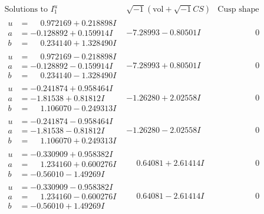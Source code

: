 \documentclass[1p]{elsarticle_modified}
\theoremstyle{definition}
\newcommand{\I}{\sqrt{-1}}
\begin{document}
$$\begin{array}{c|c|c}  
\text{Solutions to }I^u_{1}& \I (\text{vol} + \sqrt{-1}CS) & \text{Cusp shape}\\
 \hline 
\begin{aligned}
u &= \phantom{-}0.972169 + 0.218898 I \\
a &= -0.128892 + 0.159914 I \\
b &= \phantom{-}0.234140 + 1.328490 I\end{aligned}
 & -7.28993 - 0.80501 I & \phantom{-0.000000 } 0 \\ \hline\begin{aligned}
u &= \phantom{-}0.972169 - 0.218898 I \\
a &= -0.128892 - 0.159914 I \\
b &= \phantom{-}0.234140 - 1.328490 I\end{aligned}
 & -7.28993 + 0.80501 I & \phantom{-0.000000 } 0 \\ \hline\begin{aligned}
u &= -0.241874 + 0.958464 I \\
a &= -1.81538 + 0.81812 I \\
b &= \phantom{-}1.106070 - 0.249313 I\end{aligned}
 & -1.26280 + 2.02558 I & \phantom{-0.000000 } 0 \\ \hline\begin{aligned}
u &= -0.241874 - 0.958464 I \\
a &= -1.81538 - 0.81812 I \\
b &= \phantom{-}1.106070 + 0.249313 I\end{aligned}
 & -1.26280 - 2.02558 I & \phantom{-0.000000 } 0 \\ \hline\begin{aligned}
u &= -0.330909 + 0.958382 I \\
a &= \phantom{-}1.234160 + 0.600276 I \\
b &= -0.56010 - 1.49269 I\end{aligned}
 & \phantom{-}0.64081 + 2.61414 I & \phantom{-0.000000 } 0 \\ \hline\begin{aligned}
u &= -0.330909 - 0.958382 I \\
a &= \phantom{-}1.234160 - 0.600276 I \\
b &= -0.56010 + 1.49269 I\end{aligned}
 & \phantom{-}0.64081 - 2.61414 I & \phantom{-0.000000 } 0 \\ \hline\begin{aligned}

\end{aligned}
\end{array}$$
\end{document}
